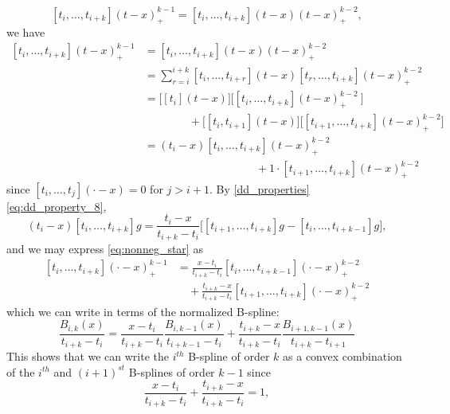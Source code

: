 \documentclass[12pt]{article}
\begin{document}
\begin{enumerate}
\[
\left[t_i,\dots,t_{i+k} \right]\left(t-x\right)_+^{k-1} = \left[t_i,\dots,t_{i+k} \right]\left(t-x\right) \left(t-x\right)_+^{k-2},
\] 
we have
\begin{align}
\left[t_i,\dots,t_{i+k} \right]\left(t-x\right)_+^{k-1} &=  \left[t_i,\dots,t_{i+k} \right]\left(t-x\right) \left(t-x\right)_+^{k-2} \nonumber\\
&= \sum_{r=i}^{i+k}\left[t_i,\dots,t_{i+r} \right] \left(t-x\right)\left[ t_r,\dots,t_{i+k}\right]\left(t-x\right)_+^{k-2} \nonumber \\
&= \bigg[ \left[t_i\right]\left(t-x \right) \bigg]\bigg[ \left[ t_i,\dots,t_{i+k}\right]\left(t-x\right)_+^{k-2}\ \bigg]\nonumber \\
& \qquad \qquad + \bigg[ \left[t_i,t_{i+1}\right]\left(t-x \right) \bigg]\bigg[ \left[ t_{i+1},\dots,t_{i+k}\right]\left(t-x\right)_+^{k-2} \bigg] \nonumber \\
&= \left(t_i-x \right) \left[ t_{i},\dots,t_{i+k}\right]\left(t-x\right)_+^{k-2} \nonumber \\
& \qquad \qquad \qquad \qquad \qquad +  1 \cdot \left[ t_{i+1},\dots,t_{i+k}\right]\left(t-x\right)_+^{k-2} \label{eq:nonneg_star}
\end{align}
since $\left[ t_i,\dots,t_j\right]\left(\cdot-x\right) = 0$ for $j>i+1$. By \ref{dd_properties} \ref{eq:dd_property_8}, 
\[
\left(t_i-x \right) \left[ t_{i},\dots,t_{i+k}\right]g = \frac{t_i-x}{t_{i+k}-t_{i}}\bigg[\left[ t_{i+1},\dots,t_{i+k}\right]g -\left[ t_{i},\dots,t_{i+k-1}\right]g   \bigg],
\]
and we may express \ref{eq:nonneg_star} as 
\begin{align*}
\left[ t_{i},\dots,t_{i+k}\right]\left(\cdot - x\right)^{k-1}_+ &= \frac{x-t_i}{t_{i+k}-t_{i}}\left[ t_{i},\dots,t_{i+k-1}\right] \left(\cdot-x\right)_+^{k-2}  \\
& \quad + \frac{t_{i+k}-x}{t_{i+k}-t_{i}}\left[ t_{i+1},\dots,t_{i+k}\right] \left(\cdot-x\right)_+^{k-2} 
\end{align*}
which we can write in terms of the normalized B-spline:
\begin{equation} \label{eq:nonneg_starstar}
\frac{B_{i,k}\left(x\right)}{t_{i+k}-t_i} = \frac{x-t_i}{t_{i+k}-t_{i}}\frac{B_{i,k-1}\left(x\right)}{t_{i+k-1}-t_i} + \frac{t_{i+k}-x}{t_{i+k}-t_{i}} \frac{B_{i+1,k-1}\left(x\right)}{t_{i+k}-t_{i+1}}
\end{equation}
This shows that we can write the $i^{th}$ B-spline of order $k$ as a convex combination of the $i^{th}$ and $\left(i+1\right)^{st}$ B-splines of order $k-1$ since 
\[
\frac{x-t_i}{t_{i+k}-t_{i}} + \frac{t_{i+k}-x}{t_{i+k}-t_{i}}  = 1,
\]
\end{enumerate}
\end{document}
